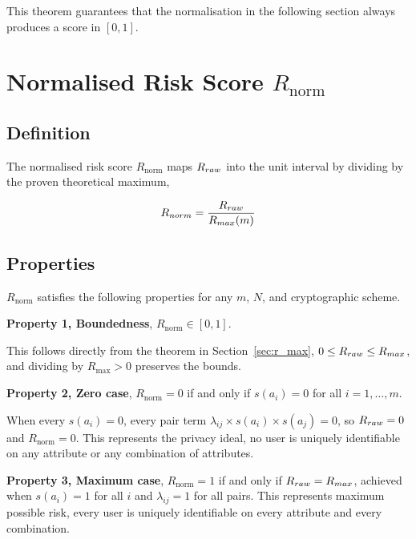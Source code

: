This theorem guarantees that the normalisation in the
following section always produces a score in $[0, 1]$.

\section{Normalised Risk Score \texorpdfstring{$R_{\mathrm{norm}}$}{R\_norm}}
\label{sec:r_norm}

\subsection{Definition}

The normalised risk score $R_{\mathrm{norm}}$ maps
$R_{raw}$ into the unit interval by dividing by the
proven theoretical maximum,

\begin{equation}
R_{norm} = \frac{R_{raw}}{R_{max}(m)}
\label{eq:r_norm}
\end{equation}

\subsection{Properties}

\begin{proposition}
$R_{\mathrm{norm}}$ satisfies the following properties
for any $m$, $N$, and cryptographic scheme.
\end{proposition}

\textbf{Property 1, Boundedness},
$R_{\mathrm{norm}} \in [0, 1]$.

This follows directly from the theorem in
Section~\ref{sec:r_max}, $0 \leq R_{raw}
\leq R_{max}$, and dividing by $R_{\mathrm{max}}
> 0$ preserves the bounds.

\textbf{Property 2, Zero case},
$R_{\mathrm{norm}} = 0$ if and only if $s(a_i) = 0$
for all $i = 1, \ldots, m$.

When every $s(a_i) = 0$, every pair term
$\lambda_{ij} \times s(a_i) \times s(a_j) = 0$,
so $R_{raw} = 0$ and $R_{\mathrm{norm}} = 0$.
This represents the privacy ideal, no user is
uniquely identifiable on any attribute or any
combination of attributes.

\textbf{Property 3, Maximum case},
$R_{\mathrm{norm}} = 1$ if and only if
$R_{raw} = R_{max}$, achieved when $s(a_i) = 1$
for all $i$ and $\lambda_{ij} = 1$ for all pairs.
This represents maximum possible risk, every user is
uniquely identifiable on every attribute and every
combination.

